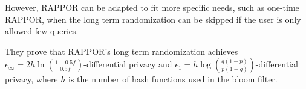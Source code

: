 However, RAPPOR can be adapted to fit more specific needs, such as one-time
RAPPOR, when the long term randomization can be skipped if the user is only
allowed few queries.

They prove that RAPPOR's long term randomization achieves $\epsilon_\infty = 2h
\ln\left(\frac{1-0.5 f}{0.5f}\right)$-differential privacy and $\epsilon_1 =
h\log\left(\frac{q(1-p)}{p(1-q)}\right)$-differential privacy, where $h$ is the
number of hash functions used in the bloom filter.